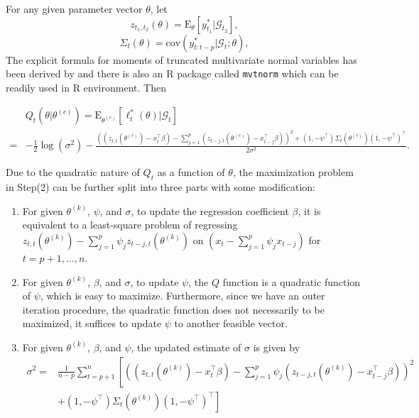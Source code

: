 \documentclass[a4paper,12pt]{article}
\newcommand{\E}{\mathop{\mathbb{E}}}
\def \cov{\mbox{cov}}
\def \trans{^\intercal}
\def \E{\mbox{E}}
\def \G {\mathcal{G}}
\begin{document}
    For any given parameter vector $\theta$, let
    $$z_{t_1,t_2}(\theta) = \E_\theta[y_{t_1}^*|\G_{t_2}],$$
    $$\Sigma_t(\theta)  = \cov(y_{t:t-p}^*|\G_t;\theta),$$
    The explicit formula for moments of truncated multivariate normal variables has been derived by \citet{Tallis1961} and there is also an R \citep{R} package called \verb$mvtnorm$ \citep{mvtnorm, GenzBretz2009} which can be readily used in R environment. Then

    \begin{align*}
	    &Q_t(\theta| \theta^{(c)})= \E_{\theta^{(c)}}\left[ \ell_t^*(\theta)|\G_t\right]\\
	    = &-\frac{1}{2}\log(\sigma^2) - \frac{\left( 
	    (z_{t,t}(\theta^{(c)})-x_t\trans \beta) 
	    -\sum_{j=1}^p\left( z_{t-j,t}(\theta^{(c)})-x_{t-j}\trans\beta \right)
	    \right)^2 + (1,-\psi\trans)\Sigma_t(\theta^{(c)}) (1,-\psi\trans)\trans}{2\sigma^2}.
    \end{align*}

    Due to the quadratic nature of $Q_t$ as a function of $\theta$, the maximization problem in {Step(2)} can be further split into three parts with some modification:
    \begin{enumerate}
	    \item For given $\theta^{(k)}$, $\psi$, and $\sigma$, to update the regression coefficient $\beta$, it is equivalent to a least-square problem of regressing
		    $ z_{t,t}(\theta^{(k)}) - \sum_{j=1}^p \psi_j z_{t-j,t}(\theta^{(k)})$ on $ (x_t - \sum_{j=1}^p \psi_j x_{t-j})$ for $t=p+1,\dots,n$.
	    \item For given $\theta^{(k)}$, $\beta$, and $\sigma$, to update $\psi$, the $Q$ function is a quadratic function of $\psi$, which is easy to maximize. Furthermore, since we have an outer iteration procedure, the quadratic function does not necessarily to be maximized, it suffices to update $\psi$ to another feasible vector.

	    \item For given $\theta^{(k)}$, $\beta$, and $\psi$, the updated estimate of $\sigma$ is given by
		    \begin{align*}
			    \sigma^2 = &\frac{1}{n-p}\sum_{t=p+1}^n \left[ \left( (z_{t,t}(\theta^{(k)})-x_t\trans \beta) - \sum_{j=1}^p \psi_j (z_{t-j,t}(\theta^{(k)}) - x_{t-j}\trans \beta)\right)^2 \right.\\
			    &+\left. (1,-\psi\trans)\Sigma_t(\theta^{(k)}) (1,-\psi\trans)\trans \right]
		    \end{align*}
    \end{enumerate}
\end{document}
